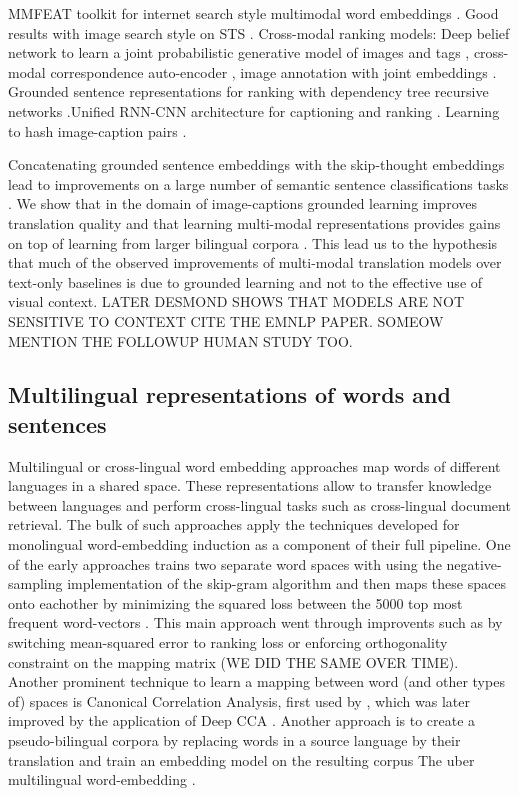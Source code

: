  MMFEAT toolkit for internet search style multimodal word embeddings \cite{kiela2016mmfeat}. Good results with image search style on STS \cite{glavavs2017if}. 
Cross-modal ranking models: Deep belief network to learn a joint probabilistic generative model of images and tags \cite{srivastava2012learning}, cross-modal correspondence auto-encoder \cite{feng2014cross}, image annotation with joint embeddings \cite{weston2010large}. Grounded sentence representations for ranking with dependency tree recursive networks \cite{socher2014grounded}.Unified RNN-CNN architecture for captioning and ranking \cite{kiros2014multimodal}. Learning to hash image-caption pairs \cite{jiang2016deep,cao2016deep}.

Concatenating grounded sentence embeddings with the skip-thought embeddings lead to improvements on a large number of semantic sentence classifications tasks \cite{kiela2017learning}. We show that in the domain of image-captions 
grounded learning improves translation quality and that learning multi-modal representations provides gains on top of learning from larger bilingual corpora \cite{elliott2017imagination}.  This lead us to the hypothesis that much of the observed improvements of multi-modal translation models over text-only baselines is due to grounded learning and not to the effective use of visual context. LATER DESMOND SHOWS THAT MODELS ARE NOT SENSITIVE TO CONTEXT CITE THE EMNLP PAPER. SOMEOW MENTION THE FOLLOWUP HUMAN STUDY TOO.

\subsection{Multilingual representations of words and sentences}
Multilingual or cross-lingual word embedding approaches map words of different languages in a shared space. These representations allow to transfer knowledge between languages and 
perform cross-lingual tasks such as cross-lingual document retrieval. The bulk of such approaches apply the techniques developed for monolingual word-embedding induction as a component
of their full pipeline. One of the early approaches trains two separate word spaces with using the negative-sampling implementation of the skip-gram algorithm and then maps these spaces onto eachother by minimizing the squared loss between the 5000 top most frequent word-vectors \cite{mikolov2013exploiting}. This main approach went through improvents
such as by switching mean-squared error to ranking loss \cite{lazaridou2015hubness} or enforcing orthogonality constraint on the mapping matrix 
\cite{xing2015normalized}   (WE DID THE SAME OVER TIME). Another prominent technique to learn a mapping between word (and other types of) spaces is Canonical Correlation Analysis, first 
used by \cite{faruqui2014improving}, which was later improved by the application of Deep CCA \cite{lu2015deep}. Another approach is to create a pseudo-bilingual corpora by replacing words
in a source language by their translation and train an embedding model on the resulting corpus 
The uber multilingual word-embedding \cite{ammar2016massively}.

